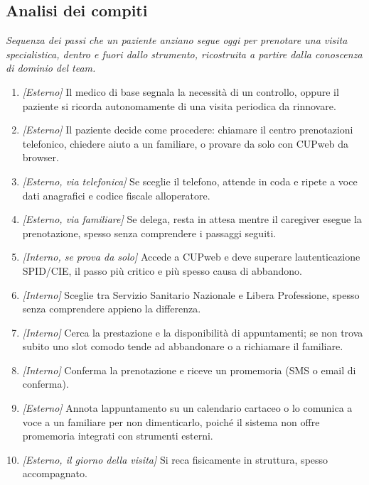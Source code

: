 \subsection{Analisi dei compiti}

\emph{Sequenza dei passi che un paziente anziano segue oggi per
prenotare una visita specialistica, dentro e fuori dallo strumento,
ricostruita a partire dalla conoscenza di dominio del team.}

\begin{enumerate}
\item
  \emph{[Esterno]} Il medico di base segnala la necessità di un
  controllo, oppure il paziente si ricorda autonomamente di una visita
  periodica da rinnovare.
\item
  \emph{[Esterno]} Il paziente decide come procedere: chiamare il
  centro prenotazioni telefonico, chiedere aiuto a un familiare, o
  provare da solo con CUPweb da browser.
\item
  \emph{[Esterno, via telefonica]} Se sceglie il telefono, attende in
  coda e ripete a voce dati anagrafici e codice fiscale
  all\textquotesingle operatore.
\item
  \emph{[Esterno, via familiare]} Se delega, resta in attesa mentre il
  caregiver esegue la prenotazione, spesso senza comprendere i passaggi
  seguiti.
\item
  \emph{[Interno, se prova da solo]} Accede a CUPweb e
  deve superare l\textquotesingle autenticazione SPID/CIE, il passo più
  critico e più spesso causa di abbandono.
\item
  \emph{[Interno]} Sceglie tra Servizio Sanitario Nazionale e Libera
  Professione, spesso senza comprendere appieno la differenza.
\item
  \emph{[Interno]} Cerca la prestazione e la disponibilità di
  appuntamenti; se non trova subito uno slot comodo tende ad abbandonare
  o a richiamare il familiare.
\item
  \emph{[Interno]} Conferma la prenotazione e riceve un promemoria
  (SMS o email di conferma).
\item
  \emph{[Esterno]} Annota l\textquotesingle appuntamento su un
  calendario cartaceo o lo comunica a voce a un familiare per non
  dimenticarlo, poiché il sistema non offre promemoria integrati con
  strumenti esterni.
\item
  \emph{[Esterno, il giorno della visita]} Si reca fisicamente in
  struttura, spesso accompagnato.
\end{enumerate}

